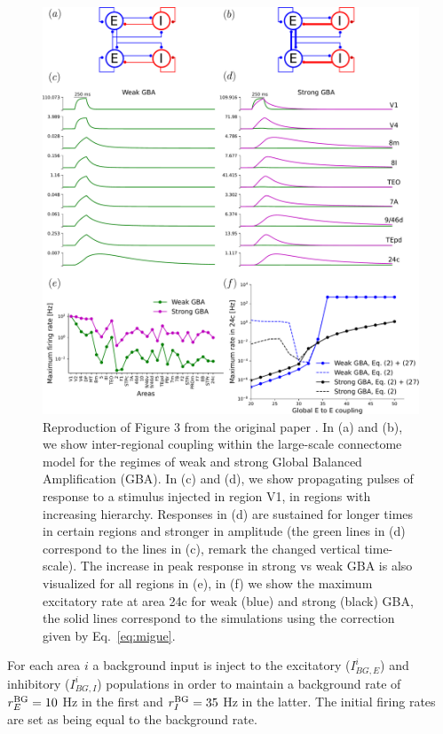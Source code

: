 \begin{figure}[!hb]
 \centering
 \includegraphics[scale=0.4]{figures/figure3.pdf}
 \caption{Reproduction of Figure 3 from the original paper \cite{joglekar2018inter}. In (a) and (b), we show inter-regional coupling within the large-scale connectome model for the regimes of weak and strong Global Balanced Amplification (GBA). In (c) and (d), we show propagating pulses of response to a stimulus injected in region V1, in regions with increasing hierarchy. Responses in (d) are sustained for longer times in certain regions and stronger in amplitude (the green lines in (d) correspond to the lines in (c), remark the changed vertical time-scale). The increase in peak response in strong vs weak GBA is also visualized for all regions in (e), in (f) we show the maximum excitatory rate at area 24c for weak (blue) and strong (black) GBA, the solid lines correspond to the simulations using the correction given by Eq.~\ref{eq:migue}.}\label{fig:fig2}
\end{figure}

For each area $i$ a background input is inject to the excitatory ($I_{BG,E}^{i}$) and inhibitory ($I_{BG,I}^{i}$)  populations in order to maintain a background rate of $r_E^{\rm BG} = 10$ Hz in the first and $r_I^{\rm BG} = 35$ Hz in the latter. The initial firing rates are set as being equal to the background rate.

